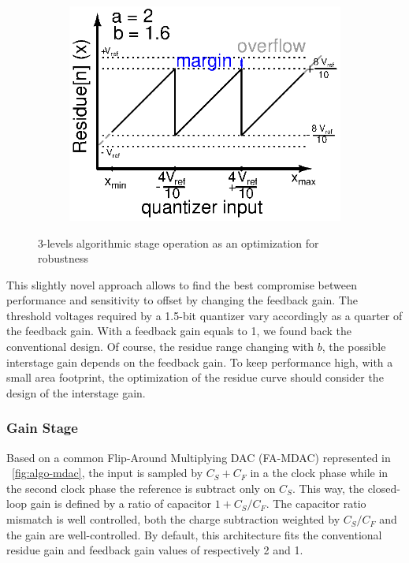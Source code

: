 \begin{figure}[htp]
\begin{subfigure}[b]{0.32\textwidth}
		\label{fig:algo-21}
	\end{subfigure}
	\begin{subfigure}[b]{0.32\textwidth}
		\centering
		\includegraphics[width=\textwidth]{Chapter4/Figs/3-levels-pattern-algo-2-1_6.ps}
		\label{fig:algo-21-6}
	\end{subfigure}
	\caption{3-levels algorithmic stage operation as an optimization for robustness}
	\label{fig:algo-quantizer}
\end{figure}

This slightly novel approach allows to find the best compromise between performance and sensitivity to offset by changing the feedback gain. The threshold voltages required by a 1.5-bit quantizer vary accordingly as a quarter of the feedback gain. With a feedback gain equals to 1, we found back the conventional design. Of course, the residue range changing with $b$, the possible interstage gain depends on the feedback gain. To keep performance high, with a small area footprint, the optimization of the residue curve should consider the design of the interstage gain.

	\subsubsection{Gain Stage}              %
	\label{sec:algo_gain_stage}
Based on a common Flip-Around Multiplying DAC (FA-MDAC) represented in \figurename~\ref{fig:algo-mdac}, the input is sampled by \(C_S+C_F\) in a the clock phase while in the second clock phase the reference is subtract only on \(C_S\). This way, the closed-loop gain is defined by a ratio of capacitor \(1+C_S/C_F\). The capacitor ratio mismatch is well controlled, both the charge subtraction weighted by \(C_S/C_F\) and the gain are well-controlled. By default, this architecture fits the conventional residue gain and feedback gain values of respectively 2 and 1.

